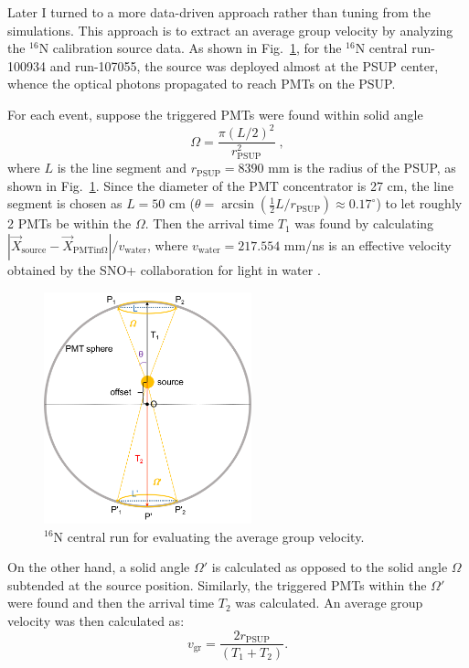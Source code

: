Later I turned to a more data-driven approach rather than tuning from the simulations. This approach is to extract an average group velocity by analyzing the $^{16}$N calibration source data. As shown in Fig.~\ref{fig:n16_groupVeloctiy}, for the $^{16}$N central run-100934 and run-107055, the source was deployed almost at the PSUP center, whence the optical photons propagated to reach PMTs on the PSUP. 

For each event, suppose the triggered PMTs were found within solid angle
\begin{equation*}
\Omega=\frac{\pi(L/2)^2}{r^2_\mathrm{PSUP}}\; ,
\end{equation*}
where $L$ is the line segment and $r_\mathrm{PSUP}=8390$ mm is the radius of the PSUP, as shown in Fig.~\ref{fig:n16_groupVeloctiy}. Since the diameter of the PMT concentrator is 27 cm, the line segment is chosen as $L = 50$ cm ($\theta=\arcsin(\frac{1}{2}L/r_\mathrm{PSUP})\approx 0.17^\circ$) to let roughly 2 PMTs be within the $\Omega$. Then the arrival time $T_1$ was found by calculating $|\vec{X}_\mathrm{source}-\vec{X}_\mathrm{PMTin\Omega}|/v_\mathrm{water}$, where $v_\mathrm{water}=217.554$ mm/ns is an effective velocity obtained by the SNO+ collaboration for light in water \cite{coulter2013modelling}.

\begin{figure}[!htb]
	\centering
	\includegraphics[width=6cm]{n16_groupVelocity.png}
	\caption{$^{16}$N central run for evaluating the average group velocity.}
	\label{fig:n16_groupVeloctiy}
\end{figure}

On the other hand, a solid angle $\Omega'$ is calculated as opposed to the solid angle $\Omega$ subtended at the source position. Similarly, the triggered PMTs within the $\Omega'$ were found and then the arrival time $T_2$ was calculated. An average group velocity was then calculated as:
\begin{equation}
v_\mathrm{gr}=\frac{2 r_\mathrm{PSUP}}{(T_1+T_2)}.
\end{equation}

